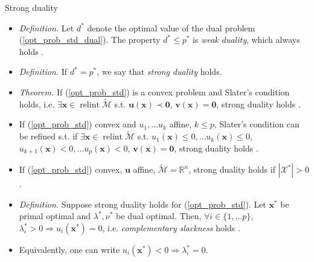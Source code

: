 \documentclass{beamer}
\numberwithin{equation}{section}
\newcommand{\aref}[1]{\alert{\ref{#1}}}
\begin{document}
\begin{frame}{Strong duality}
    \begin{itemize}
        \item
        \textit{Definition.} Let $ d^* $ denote the optimal value of the dual
        problem (\aref{opt_prob_std_dual}). The property $ d^* \le p^* $ is
        \textit{weak duality}, which always holds \cite{bv_convex_opt}.

        \item
        \textit{Definition.} If $ d^* = p^* $, we say that
        \textit{strong duality} holds.

        \item
        \textit{Theorem.} If (\aref{opt_prob_std}) is a convex problem and
        Slater's condition holds, i.e. $ \exists \mathbf{x} \in
        \operatorname{relint}\tilde{\mathcal{M}} $ s.t.
        $ \mathbf{u}(\mathbf{x}) \prec \mathbf{0} $,
        $ \mathbf{v}(\mathbf{x}) = \mathbf{0} $, strong duality holds
        \cite{bv_convex_opt}.

        \item
        If (\aref{opt_prob_std}) convex and $ u_1, \ldots u_k $ affine,
        $ k \le p $, Slater's condition can be refined s.t. if
        $ \exists \mathbf{x} \in
        \operatorname{relint}\tilde{\mathcal{M}} $ s.t.
        $ u_1(\mathbf{x}) \le 0, \ldots u_k(\mathbf{x}) \le 0 $,
        $ u_{k + 1}(\mathbf{x}) < 0, \ldots u_p(\mathbf{x}) < 0 $,
        $ \mathbf{v}(\mathbf{x}) = \mathbf{0} $, strong duality
        holds \cite{bv_convex_opt}.

        \item
        If (\aref{opt_prob_std}) convex, $ \mathbf{u} $ affine,
        $ \tilde{\mathcal{M}} = \mathbb{R}^n $, strong duality holds if
        $ |\mathcal{X}^*| > 0 $.

        \item
        \textit{Definition.} Suppose strong duality holds for
        (\aref{opt_prob_std}). Let $ \mathbf{x}^* $ be primal optimal and
        $ \lambda^*, \nu^* $ be
        dual optimal. Then, $ \forall i \in \{1, \ldots p\} $,
        $ \lambda_i^* > 0 \Rightarrow u_i(\mathbf{x}^*) = 0 $, i.e.
        \textit{complementary slackness} holds \cite{bv_convex_opt}.

        \item
        Equivalently, one can write $ u_i(\mathbf{x}^*) < 0 \Rightarrow
        \lambda_i^* = 0 $.
    \end{itemize}
\end{frame}
\end{document}
